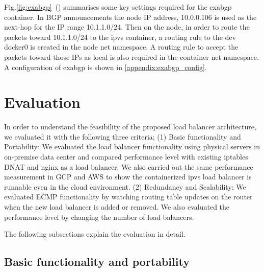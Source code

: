Fig.\ref{fig:exabgp}~() summarises some key settings required for the exabgp container.
In BGP announcements the node IP address, 10.0.0.106 is used as the next-hop for the IP range 10.1.1.0/24.
Then on the node, in order to route the packets toward 10.1.1.0/24 to the ipvs container, 
a routing rule to the dev docker0 is created in the node net namespace. 
A routing rule to accept the packets toward those IPs as local is also required in the container net namespace. 
A configuration of exabgp is shown in \ref{appendix:exabgp_config}.


\section{Evaluation}\label{Evaluation}

In order to understand the feasibility of the proposed load balancer architecture, we evaluated it with the following three criteria;
(1) Basic functionality and Portability:
We evaluated the load balancer functionality using physical servers in on-premise data center and compared performance level with existing iptables DNAT and nginx as a load balancer.
We also carried out the same performance measurement in GCP and AWS to show the containerized ipvs load balancer is runnable even in the cloud environment.
(2) Redundancy and Scalability:
We evaluated ECMP functionality by watching routing table updates on the router when the new load balancer is added or removed.
We also evaluated the performance level by changing the number of load balancers.

The following subsections explain the evaluation in detail.



\subsection{Basic functionality and portability}

